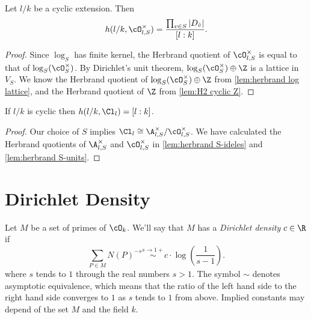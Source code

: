 \begin{corollary} \label{lem:herbrand S-units}
	Let $l/k$ be a cyclic extension. Then
	\[
		h(l/k,\cO_{l,S}^\times) = \frac{\prod_{v\in S} |D_{\hat v}|}{[l:k]}.
	\]
\end{corollary}

\begin{proof}
	Since $\log_S$ has finite kernel, the Herbrand quotient of $\cO_{l,S}^\times$ is
	equal to that of $\log_S(\cO_S^\times)$.
	By Dirichlet's unit theorem, $\log_S(\cO_S^\times) \oplus \Z$ is a lattice in
	$V_S$.
	We know the Herbrand quotient of $\log_S(\cO_S^\times) \oplus \Z$
	from \ref{lem:herbrand log lattice}, and the Herbrand quotient of $\Z$ from \ref{lem:H2 cyclic Z}.
\end{proof}

\begin{corollary} \label{lem:herbrand idele class group}
	If $l/k$ is cyclic then $h(l/k,\Cl_l) = [l:k]$.
\end{corollary}

\begin{proof}
	Our choice of $S$ implies $\Cl_l \cong \A_{l,S}^\times / \cO_{l,S}^\times$.
	We have calculated the Herbrand quotients of $\A_{l,S}^\times$ and $\cO_{l,S}^\times$
	in \ref{lem:herbrand S-ideles} and \ref{lem:herbrand S-units}.
\end{proof}





\section{Dirichlet Density}

\begin{definition} \label{def:Dirichlet density}
	Let $M$ be a set of primes of $\cO_k$.
	We'll say that $M$ has a \emph{Dirichlet density} $c \in \R$ if
	\[
		\sum_{P \in M} N(P)^{-s} \stackrel{s \to 1+}\sim c  \cdot \log\left(\frac{1}{s-1}\right).
	\]
	where $s$ tends to $1$ through the real numbers $s>1$.
	The symbol $\sim$ denotes asymptotic equivalence, which means that the ratio of the left hand
	side to the right hand side converges to $1$ as $s$ tends to $1$ from above.
	Implied constants may depend of the set $M$ and the field $k$.
\end{definition}


